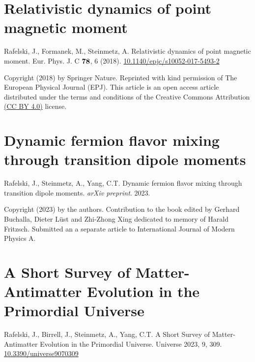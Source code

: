 %

\chapter{Relativistic dynamics of point magnetic moment}
\label{appendixC}
\begin{center}
Rafelski, J., Formanek, M., Steinmetz, A. Relativistic dynamics of point magnetic moment. Eur. Phys. J. C $\boldsymbol{78}$, 6 (2018). \href{https://doi.org/10.1140/epjc/s10052-017-5493-2}{10.1140/epjc/s10052-017-5493-2}
\end{center}

\noindent Copyright (2018) by Springer Nature. Reprinted with kind permission of The European Physical Journal (EPJ). This article is an open access article distributed under the terms and conditions of the Creative Commons Attribution \href{https://creativecommons.org/licenses/by/4.0/}{(CC BY 4.0)} license.

%

\chapter{Dynamic fermion flavor mixing through transition dipole moments}
\label{appendixD}
\begin{center}
Rafelski, J., Steinmetz, A., Yang, C.T. Dynamic fermion flavor mixing through transition dipole moments. \emph{arXiv preprint}. 2023.
\end{center}

\noindent Copyright (2023) by the authors. Contribution to the book edited by Gerhard Buchalla, Dieter L\"ust
and Zhi-Zhong Xing dedicated to memory of Harald Fritzsch. Submitted an a separate article to International Journal of Modern Physics A.

%

\chapter{A Short Survey of Matter-Antimatter Evolution in the Primordial Universe}
\label{appendixE}
\begin{center}
Rafelski, J., Birrell, J., Steinmetz, A., Yang, C.T. A Short Survey of Matter-Antimatter Evolution in the Primordial Universe. Universe 2023, 9, 309. \href{https://doi.org/10.3390/universe9070309}{10.3390/universe9070309}
\end{center}

